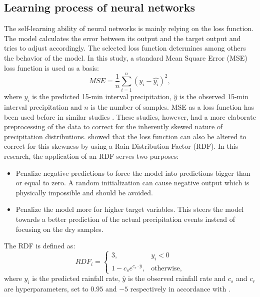 \documentclass[twocolumn, 10pt, a4paper]{memoir}
\begin{document}
	\subsection{Learning process of neural networks} \label{sec: Learning NN}
	The self-learning ability of neural networks is mainly relying on the loss function. The model calculates the error between its output and the target output and tries to adjust accordingly. The selected loss function determines among others the behavior of the model. In this study, a standard Mean Square Error (MSE) loss function is used as a basis:
	\begin{equation} \label{eq: MSE}
		MSE = \frac{1}{n} \sum_{i=1}^{n} (y_i - \hat{y_i})^2,
	\end{equation}
	where ${y_i}$ is the predicted 15-min interval precipitation, $\hat{y}$ is the observed 15-min interval precipitation and $n$ is the number of samples.
	MSE as a loss function has been used before in similar studies \cite{Pudashine2020, Diba2021}. These studies, however, had a more elaborate preprocessing of the data to correct for the inherently skewed nature of precipitation distributions.  showed that the loss function can also be altered to correct for this skewness by using a Rain Distribution Factor (RDF). In this research, the application of an RDF serves two purposes:
	
	\begin{itemize}
		\item Penalize negative predictions to force the model into predictions bigger than or equal to zero. A random initialization can cause negative output which is physically impossible and should be avoided.
		\item Penalize the model more for higher target variables. This steers the model towards a better prediction of the actual precipitation events instead of focusing on the dry samples.
	\end{itemize}
	\vspace{3mm}
	The RDF is defined as:
	\begin{equation}
		\label{eq: RDF}
		RDF_i =\begin{cases}
			3, & y_i < 0\\
			1-c_s e^{c_r\cdot{}\hat{y}}, & \text{otherwise},
		\end{cases}
	\end{equation}
	where $y_i$ is the predicted rainfall rate, $\hat{y}$ is the observed rainfall rate and $c_s$ and $c_r$ are hyperparameters, set to $0.95$ and $-5$ respectively in accordance with .
	
\end{document}
